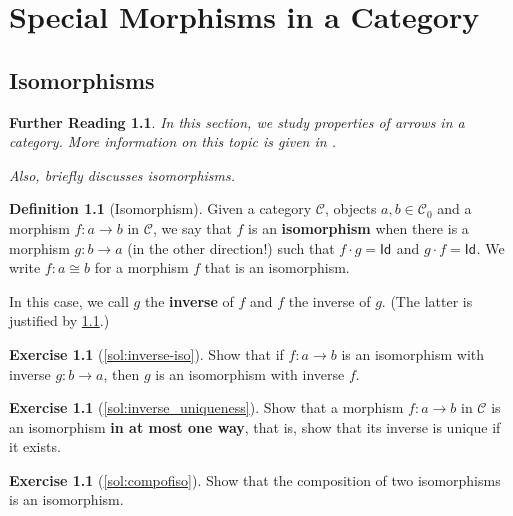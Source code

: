 \documentclass[a4paper,11pt, oneside,titlepage=false]{scrbook}
\theoremstyle{plain}
\newtheorem*{reading*}{Further Reading}
\theoremstyle{definition}
\newtheorem{rem}[thm]{Remark}
\newtheorem{dfn}[thm]{Definition}
\newtheorem{exer}[thm]{Exercise}
\newcommand{\cfont}[1]{\ensuremath{\mathsf{#1}}}
\newcommand{\Cat}[1]{\mathcal{#1}}
\newcommand{\CC}{\Cat{C}}
\newcommand{\Ob}[1]{{#1}_0}
\newcommand{\CHom}[3]{{#1}(#2,#3)}
\newcommand{\Id}[1][]{\cfont{Id}_{#1}}
\newcommand{\Comp}{\cdot}
\begin{document}
\chapter{Special Morphisms in a Category}

\section{Isomorphisms}
\label{sec:isos}

\begin{reading*}
  In this section, we study properties of arrows in a category.
  More information on this topic is given in \cite[\S 2.7]{barr-wells}.

  Also, \cite[\S 2.2]{pierce} briefly discusses isomorphisms.
\end{reading*}


\begin{dfn}[Isomorphism]
  Given a category $\CC$, objects $a,b \in \Ob{\CC}$ and a morphism $f : a \to b$ in $\CC$, we say that $f$ is an \textbf{isomorphism} when there is a morphism $g : b \to a$ (in the other direction!) such that $f \Comp g = \Id$ and $g \Comp f = \Id$.
  We write $f : a \cong b$ for a morphism $f$ that is an isomorphism.

  In this case, we call $g$ the \textbf{inverse} of $f$ and $f$ the inverse of $g$. (The latter is justified by \cref{exer:inverse-iso}.)
\end{dfn}

\begin{exer}[\cref{sol:inverse-iso}]\label{exer:inverse-iso}
  Show that if $f : a \to b$ is an isomorphism with inverse $g : b \to a$, then $g$ is an isomorphism with inverse $f$.
\end{exer}

\begin{exer}[\cref{sol:inverse_uniqueness}]\label{exer:inverse_uniqueness}
  Show that a morphism $f : a \to b$ in $\CC$ is an isomorphism \textbf{in at most one way}, that is, show that its inverse is unique if it exists.
\end{exer}

\begin{exer}[\cref{sol:compofiso}]\label{exer:compofiso}
  Show that the composition of two isomorphisms is an isomorphism.
\end{exer}
\end{document}
